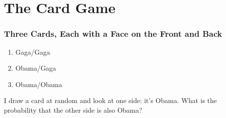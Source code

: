 \documentclass{beamer}
\begin{document}
\section{The Card Game}
\begin{frame}
\frametitle{Three Cards, Each with a Face on the Front and Back}
\begin{figure}
\hspace{1em}
\end{figure}
\begin{enumerate}
	\item Gaga/Gaga
	\item Obama/Gaga
	\item Obama/Obama
\end{enumerate} 
\begin{alertblock}{I draw a card at random and look at one side: it's Obama. What is the probability that the other side is also Obama?\\\hfill}\end{alertblock}
\end{frame}
\end{document}
